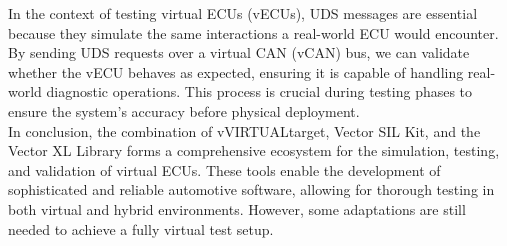 In the context of testing virtual ECUs (vECUs), UDS messages are essential because they simulate the same interactions a real-world ECU would encounter. By sending UDS requests over a virtual CAN (vCAN) bus, we can validate whether the vECU behaves as expected, ensuring it is capable of handling real-world diagnostic operations. This process is crucial during testing phases to ensure the system's accuracy before physical deployment.\\


In conclusion, the combination of vVIRTUALtarget, Vector SIL Kit, and the Vector XL Library forms a comprehensive ecosystem for the simulation, testing, and validation of virtual ECUs. These tools enable the development of sophisticated and reliable automotive software, allowing for thorough testing in both virtual and hybrid environments. However, some adaptations are still needed to achieve a fully virtual test setup.